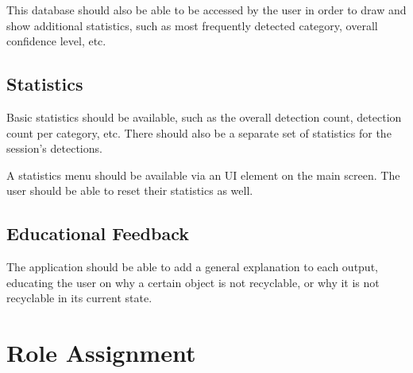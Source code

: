 \documentclass[conference]{IEEEtran}
\begin{document}
This database should also be able to be accessed by the user in order to draw and show additional statistics, such as most frequently detected category, overall confidence level, etc.
\newline
\subsection{Statistics}
Basic statistics should be available, such as the overall detection count, detection count per category, etc. There should also be a separate set of statistics for the session's detections.

A statistics menu should be available via an UI element on the main screen. The user should be able to reset their statistics as well.
\newline
\subsection{Educational Feedback}
The application should be able to add a general explanation to each output, educating the user on why a certain object is not recyclable, or why it is not recyclable in its current state.

\newpage
\section{Role Assignment}
\end{document}
